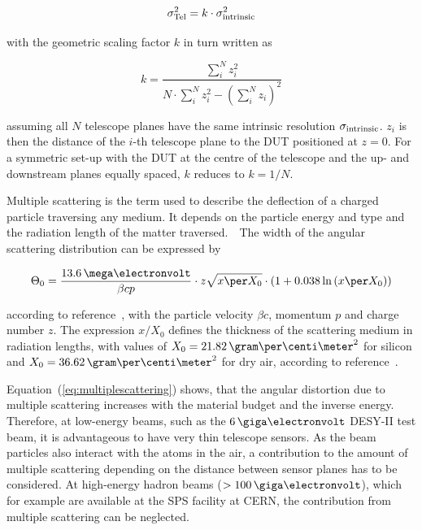 \begin{equation}
\label{eq:telescopepointing}
\sigma_{\textrm{Tel}}^2 = k \cdot \sigma_{\textrm{intrinsic}}^2
\end{equation}

\noindent with the geometric scaling factor $k$ in turn written as

\begin{equation}
k = \frac{\sum_i^N z_i^2}{N \cdot \sum_i^N z_i^2 - \left( \sum_i^N z_i \right)^2}
\end{equation}

\noindent assuming all $N$ telescope planes have the same intrinsic resolution $\sigma_{\textrm{intrinsic}}$. 
$z_i$ is then the distance of the $i$-th telescope plane to the DUT positioned at $z=0$.
For a symmetric set-up with the DUT at the centre of the telescope and the up- and downstream planes equally spaced, $k$ reduces to $k = 1/N$. 

Multiple scattering is the term used to describe the deflection of a charged particle traversing any medium.
It depends on the particle energy and type and the radiation length of the matter traversed.\,~\cite{ref:scatteringhighland}
The width of the angular scattering distribution can be expressed by

\begin{equation}
\label{eq:multiplescattering}
\Theta_{0} = \frac{13.6\,\mega\electronvolt}{\beta c p} \cdot z
\sqrt{x \per X_0}
\cdot \left( 1 + 0.038 \ln{\left( x \per X_0\right) } \right)
\end{equation}

\noindent
according to reference~\cite{ref:PDG-2014}, with the particle velocity $\beta c$, momentum $p$ and charge number $z$. 
The expression $x/X_0$ defines the thickness of the scattering medium in radiation lengths,
 with values of $X_0 = 21.82\,\allowbreak\gram\per\centi\meter^2$ for silicon and $X_0 = 36.62\,\gram\per\centi\meter^2$ for dry air, according to reference~\cite{ref:x0values}.

Equation~(\ref{eq:multiplescattering}) shows, that the angular distortion due to multiple scattering increases with the material budget and the inverse energy.
Therefore, at low-energy beams, such as the $6\,\giga\electronvolt$ DESY-II test beam, it is advantageous to have very thin telescope sensors. 
As the beam particles also interact with the atoms in the air, a contribution to the amount of multiple scattering depending on the distance between sensor planes has to be considered. 
At high-energy hadron beams ($> 100\,\giga\electronvolt$), which for example are available at the SPS facility at CERN, the contribution from multiple scattering can be neglected.

